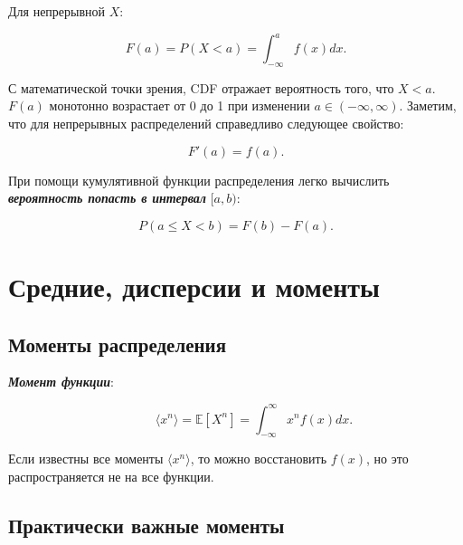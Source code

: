 \documentclass[
  russian,
  letterpaper,
]{scrbook}
\begin{document}
Для непрерывной \(X\):

\[F(a)=P(X<a)=\int_{-\infty}^a f(x)dx.\]

С математической точки зрения, CDF отражает вероятность того, что
\(X<a.\) \(F(a)\) монотонно возрастает от 0 до 1 при изменении
\(a \in (-\infty,\infty)\). Заметим, что для непрерывных распределений
справедливо следующее свойство:

\[F'(a)=f(a).\]

При помощи кумулятивной функции распределения легко вычислить
\textbf{\emph{вероятность попасть в интервал}} \([a,b):\)

\[P(a\leq X<b)=F(b)-F(a).\]

\section{Средние, дисперсии и
моменты}\label{ux441ux440ux435ux434ux43dux438ux435-ux434ux438ux441ux43fux435ux440ux441ux438ux438-ux438-ux43cux43eux43cux435ux43dux442ux44b}

\subsection{Моменты
распределения}\label{ux43cux43eux43cux435ux43dux442ux44b-ux440ux430ux441ux43fux440ux435ux434ux435ux43bux435ux43dux438ux44f}

\begin{description}
\item[\textbf{\emph{Момент функции}}:]
\[\langle x^n\rangle=\mathbb{E}[X^n]=\int_{-\infty}^\infty x^nf(x)dx.\]
\end{description}

Если известны все моменты \(\langle x^n\rangle\), то можно восстановить
\(f(x)\), но это распространяется не на все функции.

\subsection{Практически важные
моменты}\label{ux43fux440ux430ux43aux442ux438ux447ux435ux441ux43aux438-ux432ux430ux436ux43dux44bux435-ux43cux43eux43cux435ux43dux442ux44b}
\end{document}
